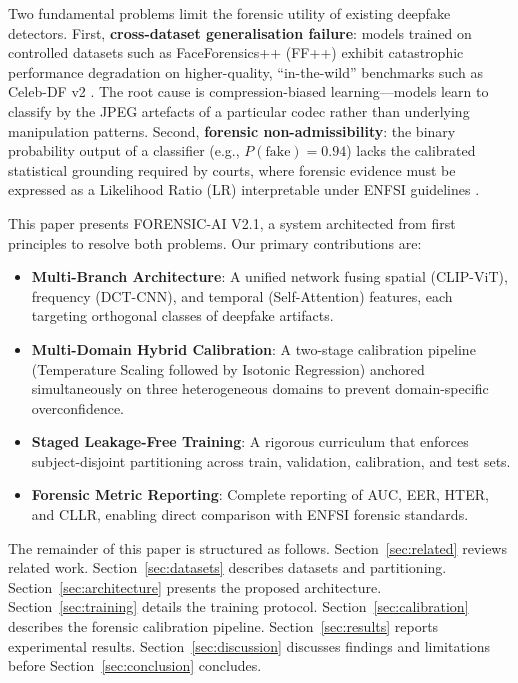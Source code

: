 \documentclass[journal]{IEEEtran}
\begin{document}
Two fundamental problems limit the forensic utility of existing deepfake detectors. First, \textbf{cross-dataset generalisation failure}: models trained on controlled datasets such as FaceForensics++ (FF++) \cite{Rossler2019} exhibit catastrophic performance degradation on higher-quality, ``in-the-wild'' benchmarks such as Celeb-DF v2 \cite{Li2020}. The root cause is compression-biased learning---models learn to classify by the JPEG artefacts of a particular codec rather than underlying manipulation patterns. Second, \textbf{forensic non-admissibility}: the binary probability output of a classifier (e.g., $P(\text{fake}) = 0.94$) lacks the calibrated statistical grounding required by courts, where forensic evidence must be expressed as a Likelihood Ratio (LR) interpretable under ENFSI guidelines \cite{ENFSI2015}.

This paper presents FORENSIC-AI V2.1, a system architected from first principles to resolve both problems. Our primary contributions are:
\begin{itemize}
    \item \textbf{Multi-Branch Architecture}: A unified network fusing spatial (CLIP-ViT), frequency (DCT-CNN), and temporal (Self-Attention) features, each targeting orthogonal classes of deepfake artifacts.
    \item \textbf{Multi-Domain Hybrid Calibration}: A two-stage calibration pipeline (Temperature Scaling followed by Isotonic Regression) anchored simultaneously on three heterogeneous domains to prevent domain-specific overconfidence.
    \item \textbf{Staged Leakage-Free Training}: A rigorous curriculum that enforces subject-disjoint partitioning across train, validation, calibration, and test sets.
    \item \textbf{Forensic Metric Reporting}: Complete reporting of AUC, EER, HTER, and CLLR, enabling direct comparison with ENFSI forensic standards.
\end{itemize}

The remainder of this paper is structured as follows. Section~\ref{sec:related} reviews related work. Section~\ref{sec:datasets} describes datasets and partitioning. Section~\ref{sec:architecture} presents the proposed architecture. Section~\ref{sec:training} details the training protocol. Section~\ref{sec:calibration} describes the forensic calibration pipeline. Section~\ref{sec:results} reports experimental results. Section~\ref{sec:discussion} discusses findings and limitations before Section~\ref{sec:conclusion} concludes.
\end{document}
